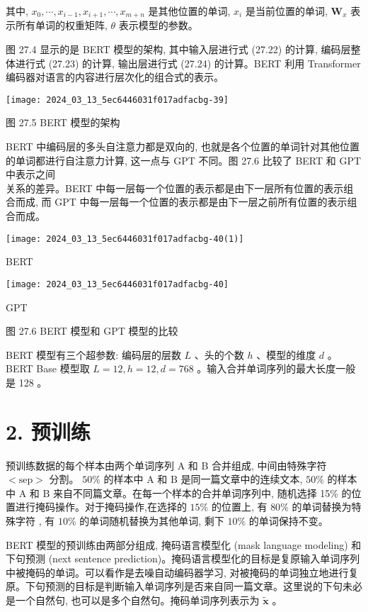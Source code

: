\documentclass[10pt]{article}
\begin{document}
其中, $x_{0}, \cdots, x_{i-1}, x_{i+1}, \cdots, x_{m+n}$ 是其他位置的单词, $x_{i}$ 是当前位置的单词, $\boldsymbol{W}_{x}$ 表示所有单词的权重矩阵, $\theta$ 表示模型的参数。

图 27.4 显示的是 BERT 模型的架构, 其中输入层进行式 (27.22) 的计算, 编码层整体进行式 (27.23) 的计算, 输出层进行式 (27.24) 的计算。BERT 利用 Transformer 编码器对语言的内容进行层次化的组合式的表示。

\begin{center}
\texttt{[image: 2024\_03\_13\_5ec6446031f017adfacbg-39]}
\end{center}

图 27.5 BERT 模型的架构

BERT 中编码层的多头自注意力都是双向的, 也就是各个位置的单词针对其他位置的单词都进行自注意力计算, 这一点与 GPT 不同。图 27.6 比较了 BERT 和 GPT 中表示之间\\
关系的差异。BERT 中每一层每一个位置的表示都是由下一层所有位置的表示组合而成, 而 GPT 中每一层每一个位置的表示都是由下一层之前所有位置的表示组合而成。

\begin{center}
\texttt{[image: 2024\_03\_13\_5ec6446031f017adfacbg-40(1)]}
\end{center}

BERT

\begin{center}
\texttt{[image: 2024\_03\_13\_5ec6446031f017adfacbg-40]}
\end{center}

GPT

图 27.6 BERT 模型和 GPT 模型的比较

BERT 模型有三个超参数: 编码层的层数 $L$ 、头的个数 $h$ 、模型的维度 $d$ 。 BERT Base 模型取 $L=12, h=12, d=768$ 。输入合并单词序列的最大长度一般是 128 。

\section*{2. 预训练}
预训练数据的每个样本由两个单词序列 A 和 B 合并组成, 中间由特殊字符 $<\mathrm{sep}>$ 分割。 $50 \%$ 的样本中 $\mathrm{A}$ 和 $\mathrm{B}$ 是同一篇文章中的连续文本, $50 \%$ 的样本中 $\mathrm{A}$ 和 $\mathrm{B}$ 来自不同篇文章。在每一个样本的合并单词序列中, 随机选择 15\% 的位置进行掩码操作。对于掩码操作,在选择的 $15 \%$ 的位置上, 有 $80 \%$ 的单词替换为特殊字符 , 有 $10 \%$ 的单词随机替换为其他单词, 剩下 $10 \%$ 的单词保持不变。

BERT 模型的预训练由两部分组成, 掩码语言模型化 (mask language modeling) 和下句预测 (next sentence prediction)。掩码语言模型化的目标是复原输入单词序列中被掩码的单词。可以看作是去噪自动编码器学习, 对被掩码的单词独立地进行复原。下句预测的目标是判断输入单词序列是否来自同一篇文章。这里说的下句未必是一个自然句, 也可以是多个自然句。掩码单词序列表示为 $\tilde{\boldsymbol{x}}$ 。
\end{document}
